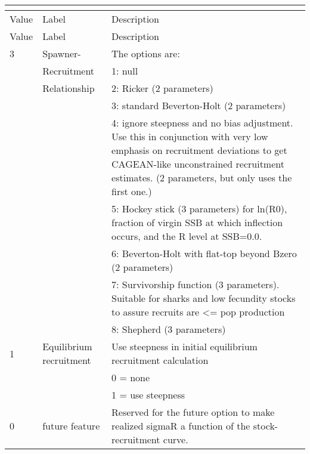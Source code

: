 \begin{center}
	\begin{longtable}{p{1cm} p{3cm} p{11cm}}
		\multicolumn{3}{l}{ }\\
		\hline
		Value & Label &  Description\\
		\hline
		\endfirsthead

		\hline
		Value & Label &  Description\\
		\hline
		\endhead

		\endfoot
		\endlastfoot

		3 & Spawner-            & The options are: \\
		  & Recruitment         & 1: null \\
		  & Relationship        & 2:  Ricker (2 parameters) \\
		  &                     & 3:  standard Beverton-Holt (2 parameters) \\
		  &                     & 4:  ignore steepness and no bias adjustment.  Use this in conjunction with very low emphasis on recruitment deviations to get CAGEAN-like unconstrained recruitment estimates. (2 parameters, but only uses the first one.)\\
		  &                     & 5:  Hockey stick (3 parameters) for ln(R0), fraction of virgin SSB at which inflection occurs, and the R level at SSB=0.0.\\
		  &                     & 6:  Beverton-Holt with flat-top beyond Bzero (2 parameters)\\
		  &                     & 7:  Survivorship function (3 parameters).  Suitable for sharks and low fecundity stocks to assure recruits are <= pop production \\
	      &                     & 8:  Shepherd (3 parameters)\\
	    \hline
	    1 & Equilibrium recruitment & Use steepness in initial equilibrium recruitment calculation \\
	      & 						& 0 = none \\
	      &							& 1 = use steepness \\
	    0 &  future feature         & Reserved for the future option to make realized sigmaR a function of the stock-recruitment curve.  \\ 
	    \hline
	\end{longtable}
\end{center}
